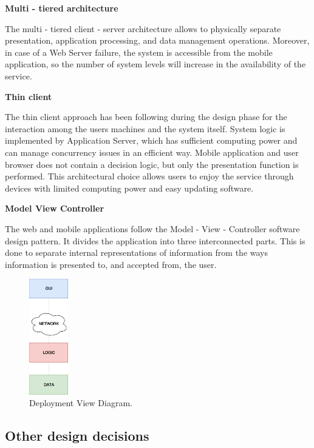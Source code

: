 \documentclass{article}
\begin{document}
	\bigskip
	\noindent
	\textbf{Multi - tiered architecture}
	
	\bigskip
	\noindent
	The multi - tiered client - server architecture allows to physically separate presentation, application processing, and data management operations.
	Moreover, in case of a Web Server failure, the system is accessible from the mobile application, so the number of system levels will increase in the availability of the service.

	\bigskip
	\noindent
	\textbf{Thin client}

	\bigskip
	\noindent
	The thin client approach has been following during the design phase for  the interaction among the users machines and the system itself.
	System logic is implemented by Application Server, which has sufficient computing power and can manage concurrency issues in an efficient way.
	Mobile application and user browser does not contain a decision logic, but only the presentation function is performed.
	This architectural choice allows users to enjoy the service through devices with limited computing power and easy updating software.

	\bigskip
	\noindent
	\textbf{Model View Controller}

	\bigskip
	\noindent
	The web and mobile applications follow the Model - View - Controller software design pattern.
	It divides the application into three interconnected parts. This is done to separate internal representations of information from the ways information is presented to, and accepted from, the user.

	\bigskip
	\begin{figure}[!h]
	\centering
	\includegraphics[width=0.15\textwidth]{img/diagrams/rp.png}
	\caption{Deployment View Diagram.}
	\end{figure}

	\subsection{Other design decisions}
\end{document}

